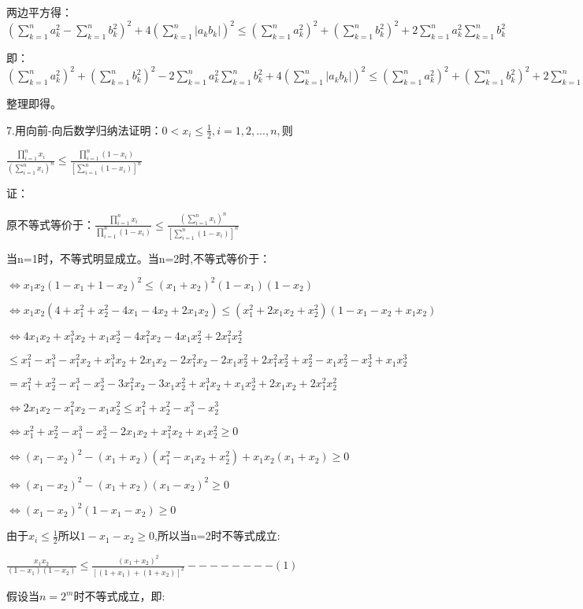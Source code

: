 \documentclass[12pt]{ctexart}
\begin{document}
两边平方得：$(\sum\limits_{k=1}^na_k^2-\sum\limits_{k=1}^nb_k^2)^2+4(\sum\limits_{k=1}^n|a_kb_k|)^2\le(\sum\limits_{k=1}^{n}a_k^2)^2+(\sum\limits_{k=1}^{n}b_k^2)^2+2\sum\limits_{k=1}^{n}a_k^2\sum\limits_{k=1}^{n}b_k^2$

即：$(\sum\limits_{k=1}^na_k^2)^2+(\sum\limits_{k=1}^nb_k^2)^2-2\sum\limits_{k=1}^na_k^2\sum\limits_{k=1}^nb_k^2+4(\sum\limits_{k=1}^n|a_kb_k|)^2\le(\sum\limits_{k=1}^{n}a_k^2)^2+(\sum\limits_{k=1}^{n}b_k^2)^2+2\sum\limits_{k=1}^{n}a_k^2\sum\limits_{k=1}^{n}b_k^2$

整理即得。

7.用向前-向后数学归纳法证明：$0<x_i\le\frac{1}{2},i=1,2,...,n,$则

$\frac{\prod\limits_{i=1}^nx_i}{(\sum\limits_{i=1}^nx_i)^n}\le\frac{\prod\limits_{i=1}^n(1-x_i)}{[\sum\limits_{i=1}^n(1-x_i)]^n}$

证：

原不等式等价于：$\frac{\prod\limits_{i=1}^{n}x_i}{\prod\limits_{i=1}^{n}(1-x_i)}\le\frac{(\sum\limits_{i=1}^{n}x_i)^n}{[\sum\limits_{i=1}^{n}(1-x_i)]^n}$


当n=1时，不等式明显成立。当n=2时,不等式等价于：

$\iff{x_1x_2(1-x_1+1-x_2)^2}\le{(x_1+x_2)^2(1-x_1)(1-x_2)}$

$\iff{x_1x_2(4+x_1^2+x_2^2-4x_1-4x_2+2x_1x_2)}\le{(x_1^2+2x_1x_2+x_2^2)(1-x_1-x_2+x_1x_2)}$

$\iff4x_1x_2+x_1^3x_2+x_1x_2^3-4x_1^2x_2-4x_1x_2^2+2x_1^2x_2^2$

$\le{}x_1^2-x_1^3-x_1^2x_2+x_1^3x_2+2x_1x_2-2x_1^2x_2-2x_1x_2^2+2x_1^2x_2^2+x_2^2-x_1x_2^2-x_2^3+x_1x_2^3$

$=x_1^2+x_2^2-x_1^3-x_2^3-3x_1^2x_2-3x_1x_2^2+x_1^3x_2+x_1x_2^3+2x_1x_2+2x_1^2x_2^2$

$\iff2x_1x_2-x_1^2x_2-x_1x_2^2\le{}x_1^2+x_2^2-x_1^3-x_2^3$

$\iff{}x_1^2+x_2^2-x_1^3-x_2^3-2x_1x_2+x_1^2x_2+x_1x_2^2\ge0$

$\iff(x_1-x_2)^2-(x_1+x_2)(x_1^2-x_1x_2+x_2^2)+x_1x_2(x_1+x_2)\ge0$

$\iff(x_1-x_2)^2-(x_1+x_2)(x_1-x_2)^2\ge0$

$\iff(x_1-x_2)^2(1-x_1-x_2)\ge0$

由于$x_i\le\frac{1}{2}$所以$1-x_1-x_2\ge0$,所以当n=2时不等式成立:

$\frac{x_1x_2}{(1-x_1)(1-x_2)}\le\frac{(x_1+x_2)^2}{[(1+x_1)+(1+x_2)]^2}--------(1)$

假设当$n=2^m$时不等式成立，即:
\end{document}
